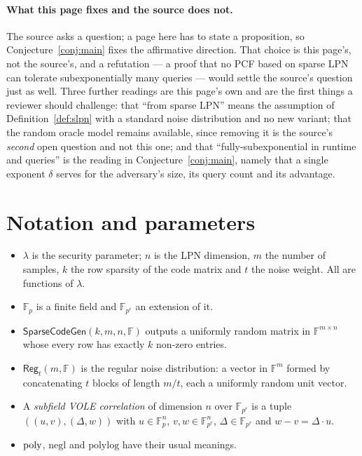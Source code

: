 \documentclass{aicr-conjecture}
\newcommand{\F}{\mathbb{F}}
\newcommand{\SparseCodeGen}{\mathsf{SparseCodeGen}}
\newcommand{\Reg}{\mathsf{Reg}}
\begin{document}
\paragraph{What this page fixes and the source does not.}
The source asks a question; a page here has to state a proposition, so
Conjecture~\ref{conj:main} fixes the affirmative direction. That choice
is this page's, not the source's, and a refutation --- a proof that no
PCF based on sparse LPN can tolerate subexponentially many queries ---
would settle the source's question just as well. Three further readings
are this page's own and are the first things a reviewer should
challenge: that ``from sparse LPN'' means the assumption of
Definition~\ref{def:slpn} with a standard noise distribution and no new
variant; that the random oracle model remains available, since removing
it is the source's \emph{second} open question and not this one; and
that ``fully-subexponential in runtime and queries'' is the reading in
Conjecture~\ref{conj:main}, namely that a single exponent $\delta$
serves for the adversary's size, its query count and its advantage.

\section{Notation and parameters}\label{sec:notation}

\begin{itemize}[nosep]
  \item $\lambda$ is the security parameter; $n$ is the LPN dimension,
    $m$ the number of samples, $k$ the row sparsity of the code matrix
    and $t$ the noise weight. All are functions of $\lambda$.
  \item $\F_{p}$ is a finite field and $\F_{p^{r}}$ an extension of it.
  \item $\SparseCodeGen(k, m, n, \F)$ outputs a uniformly random
    matrix in $\F^{m \times n}$ whose every row has exactly $k$
    non-zero entries.
  \item $\Reg_{t}(m, \F)$ is the regular noise distribution: a vector in
    $\F^{m}$ formed by concatenating $t$ blocks of length $m/t$, each a
    uniformly random unit vector.
  \item A \emph{subfield VOLE correlation} of dimension $n$ over
    $\F_{p^{r}}$ is a tuple $((u, v), (\Delta, w))$ with
    $u \in \F_{p}^{n}$, $v, w \in \F_{p^{r}}^{n}$,
    $\Delta \in \F_{p^{r}}$ and $w - v = \Delta \cdot u$.
  \item $\mathrm{poly}$, $\mathrm{negl}$ and $\mathrm{polylog}$ have their usual
    meanings.
\end{itemize}
\end{document}
